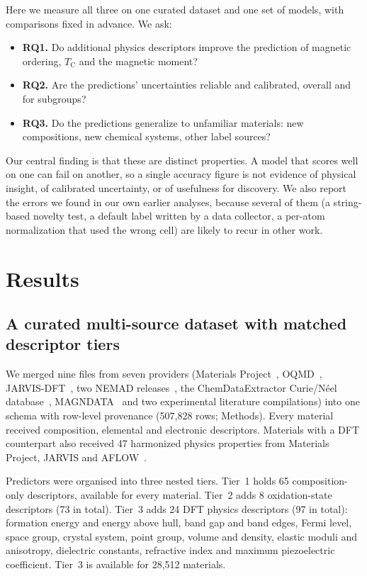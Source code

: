 \documentclass[pdflatex,sn-nature]{sn-jnl}
\newcommand{\Tc}{\ensuremath{T_\mathrm{C}}}
\begin{document}
Here we measure all three on one curated dataset and one set of models, with comparisons fixed in advance. We ask:
\begin{itemize}
\item \textbf{RQ1.} Do additional physics descriptors improve the prediction of magnetic ordering, \Tc{} and the magnetic moment?
\item \textbf{RQ2.} Are the predictions' uncertainties reliable and calibrated, overall and for subgroups?
\item \textbf{RQ3.} Do the predictions generalize to unfamiliar materials: new compositions, new chemical systems, other label sources?
\end{itemize}
Our central finding is that these are distinct properties. A model that scores well on one can fail on another, so a single accuracy figure is not evidence of physical insight, of calibrated uncertainty, or of usefulness for discovery. We also report the errors we found in our own earlier analyses, because several of them (a string-based novelty test, a default label written by a data collector, a per-atom normalization that used the wrong cell) are likely to recur in other work.

\section{Results}\label{sec:results}

\subsection{A curated multi-source dataset with matched descriptor tiers}\label{sec:dataset}

We merged nine files from seven providers (Materials Project~\cite{jain2013materials}, OQMD~\cite{saal2013oqmd}, JARVIS-DFT~\cite{choudhary2020jarvis}, two NEMAD releases~\cite{itani2025nemad}, the ChemDataExtractor Curie/N\'eel database~\cite{court2018curie}, MAGNDATA~\cite{gallego2016magndata} and two experimental literature compilations) into one schema with row-level provenance (507,828 rows; Methods). Every material received composition, elemental and electronic descriptors. Materials with a DFT counterpart also received 47 harmonized physics properties from Materials Project, JARVIS and AFLOW~\cite{curtarolo2012aflow}.

Predictors were organised into three nested tiers. Tier~1 holds 65 composition-only descriptors, available for every material. Tier~2 adds 8 oxidation-state descriptors (73 in total). Tier~3 adds 24 DFT physics descriptors (97 in total): formation energy and energy above hull, band gap and band edges, Fermi level, space group, crystal system, point group, volume and density, elastic moduli and anisotropy, dielectric constants, refractive index and maximum piezoelectric coefficient. Tier~3 is available for 28,512 materials.
\end{document}
